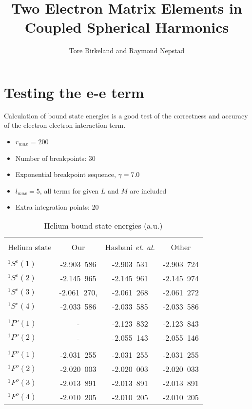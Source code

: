 \documentclass[a4paper,12pt]{paper}
\title{Two Electron Matrix Elements in Coupled Spherical Harmonics}
\author{Tore Birkeland and Raymond Nepstad}
\begin{document}
\section{Testing the e-e term}
Calculation of bound state energies is a good test of the correctness and accuracy of the electron-electron interaction term.

\begin{itemize}
	\item $r_{max}$ = 200
	\item Number of breakpoints: 30
	\item Exponential breakpoint sequence, $\gamma = 7.0$
	\item $l_{max} = 5$, all terms for given $L$ and $M$ are included
	\item Extra integration points: 20
\end{itemize}

\begin{table}
\centering
\begin{tabular}{lccc}
	\hline\\
	Helium state & Our & Hasbani \textit{et. al.} & Other\\
	\hline\\
	$^1S^e(1)$ & -2.903\ 586 & -2.903\ 531 & -2.903\ 724\\
	$^1S^e(2)$ & -2.145\ 965 & -2.145\ 961 & -2.145\ 974\\
	$^1S^e(3)$ & -2.061\ 270, & -2.061\ 268 & -2.061\ 272\\
	$^1S^e(4)$ & -2.033\ 586 & -2.033\ 585 & -2.033\ 586\\
	\\
	$^1P^o(1)$ & - & -2.123\ 832 & -2.123\ 843\\
	$^1P^o(2)$ & - & -2.055\ 143 & -2.055\ 146\\
	\\
	$^1F^o(1)$ & -2.031\ 255 & -2.031\ 255 & -2.031\ 255\\
	$^1F^o(2)$ & -2.020\ 003 & -2.020\ 003 & -2.020\ 033\\
	$^1F^o(3)$ & -2.013\ 891 & -2.013\ 891 & -2.013\ 891\\
	$^1F^o(4)$ & -2.010\ 205 & -2.010\ 205 & -2.010\ 205\\
\end{tabular}
\caption{Helium bound state energies (a.u.)}
\label{tab:}
\end{table}
\end{document}
